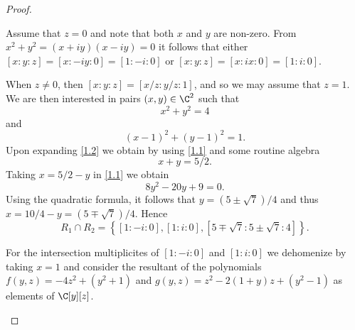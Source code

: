 \documentclass[10pt]{amsart}
\begin{document}
\begin{thm}
\begin{proof}
\begin{enumerate}[(a)]
			Assume that $z = 0$ and note that both $x$ and $y$ are non-zero.
			From $x^2 + y^2 = (x + iy)(x - iy) = 0$ it follows that either $[x : y : z] = [x : -iy : 0] = [1 : -i : 0]$
			or $[x : y : z] = [x : ix : 0] = [1 : i : 0]$.
			
			When $z \neq 0$, then $[x : y : z] = [x/z : y/z : 1]$, and so we may assume that $z = 1$.
			We are then interested in pairs $(x,y) \in \C^2$ such that 
			\begin{equation}\label{1.1}
				x^2 + y^2 = 4
			\end{equation}
			 and 
			\begin{equation}\label{1.2}
				(x - 1)^2 + (y-1)^2 = 1.
			\end{equation}
			Upon expanding \eqref{1.2} we obtain by using \eqref{1.1} and some routine algebra 
			$$x + y = 5/2.$$
			Taking $x = 5/2 - y$ in \eqref{1.1} we obtain
			$$8y^2 - 20y + 9 = 0.$$
			Using the quadratic formula, it follows that $y = (5 \pm \sqrt{7})/4$ and thus $x = 10/4 - y = \left(5 \mp \sqrt{7}\right)/4$.
			Hence
			$$R_1 \cap R_2 = \left\{[1 : -i : 0], [1 : i : 0], [5 \mp \sqrt{7} : 5 \pm \sqrt{7} : 4]\right\}.$$

			For the intersection multiplicites of $[1 : -i : 0]$ and $[1 : i : 0]$ we dehomenize by taking $x = 1$ and consider the resultant of the polynomials $f(y,z) = -4z^2 + (y^2 + 1)$ and $g(y,z) = z^2 - 2(1 + y)z + (y^2 - 1)$ as elements of $\C[y][z]$.
		\end{enumerate}
	\end{proof}
\end{thm}
\end{document}
